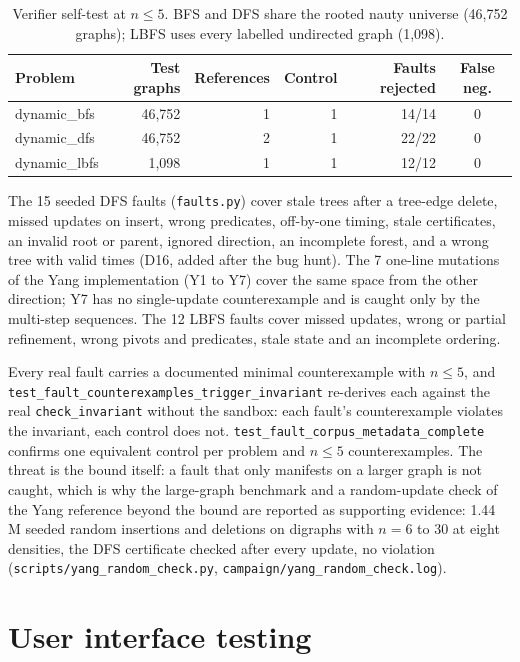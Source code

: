 \begin{table}[H]
\centering
\footnotesize
\setlength{\tabcolsep}{5pt}
\caption{Verifier self-test at $n \le 5$. BFS and DFS share the rooted nauty
universe (46{,}752 graphs); LBFS uses every labelled undirected graph
(1{,}098).}
\label{tab:selftest}
\begin{tabular}{@{}lrrrrc@{}}
\toprule
Problem & Test graphs & References & Control & Faults rejected & False neg. \\
\midrule
dynamic\_bfs & 46{,}752 & 1 & 1 & 14/14 & 0 \\
dynamic\_dfs & 46{,}752 & 2 & 1 & 22/22 & 0 \\
dynamic\_lbfs & 1{,}098 & 1 & 1 & 12/12 & 0 \\
\bottomrule
\end{tabular}
\end{table}

The 15 seeded DFS faults (\texttt{faults.py}) cover stale trees after a
tree-edge delete, missed updates on insert, wrong predicates, off-by-one timing,
stale certificates, an invalid root or parent, ignored direction, an incomplete
forest, and a wrong tree with valid times (D16, added after the bug hunt). The 7
one-line mutations of the Yang implementation (Y1 to Y7) cover the same space
from the other direction; Y7 has no single-update counterexample and is caught
only by the multi-step sequences. The 12 LBFS faults cover missed updates, wrong
or partial refinement, wrong pivots and predicates, stale state and an
incomplete ordering.

Every real fault carries a documented minimal counterexample with $n \le 5$,
and \texttt{test\_fault\_counterexamples\_trigger\_invariant} re-derives each
against the real \texttt{check\_invariant} without the sandbox: each fault's
counterexample violates the invariant, each control does not.
\texttt{test\_fault\_corpus\_metadata\_complete} confirms one equivalent
control per problem and $n \le 5$ counterexamples. The threat is the bound
itself: a fault that only manifests on a larger graph is not caught, which is
why the large-graph benchmark and a random-update check of the Yang reference
beyond the bound are reported as supporting evidence: 1.44 M seeded random
insertions and deletions on digraphs with $n = 6$ to $30$ at eight densities,
the DFS certificate checked after every update, no violation
(\texttt{scripts/yang\_random\_check.py}, \texttt{campaign/yang\_random\_check.log}).

\section{User interface testing}
\label{sec:test-ui}

